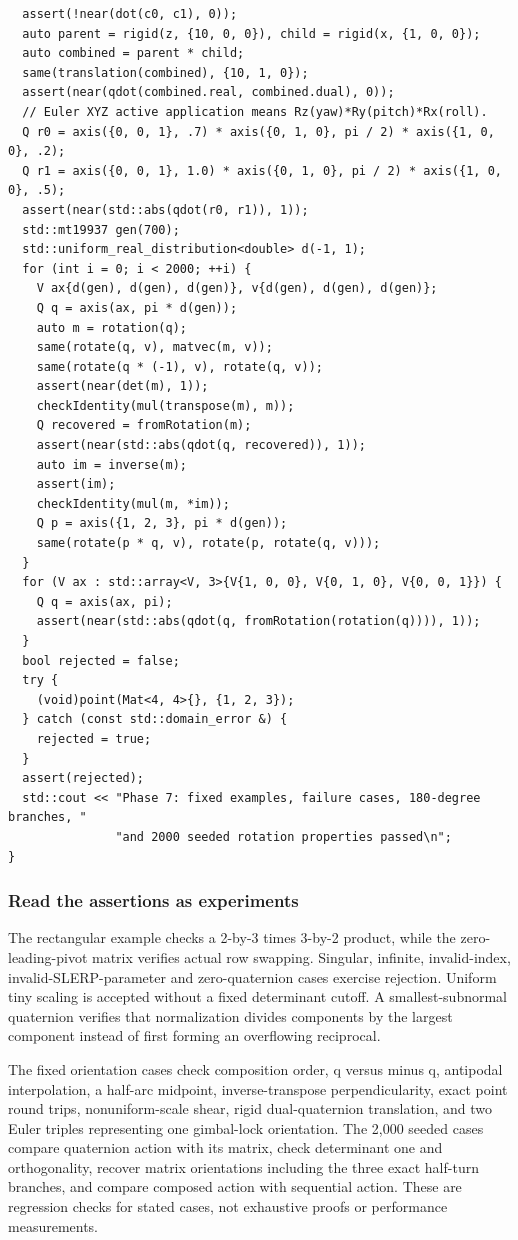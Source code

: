 \begin{verbatim}
  assert(!near(dot(c0, c1), 0));
  auto parent = rigid(z, {10, 0, 0}), child = rigid(x, {1, 0, 0});
  auto combined = parent * child;
  same(translation(combined), {10, 1, 0});
  assert(near(qdot(combined.real, combined.dual), 0));
  // Euler XYZ active application means Rz(yaw)*Ry(pitch)*Rx(roll).
  Q r0 = axis({0, 0, 1}, .7) * axis({0, 1, 0}, pi / 2) * axis({1, 0, 0}, .2);
  Q r1 = axis({0, 0, 1}, 1.0) * axis({0, 1, 0}, pi / 2) * axis({1, 0, 0}, .5);
  assert(near(std::abs(qdot(r0, r1)), 1));
  std::mt19937 gen(700);
  std::uniform_real_distribution<double> d(-1, 1);
  for (int i = 0; i < 2000; ++i) {
    V ax{d(gen), d(gen), d(gen)}, v{d(gen), d(gen), d(gen)};
    Q q = axis(ax, pi * d(gen));
    auto m = rotation(q);
    same(rotate(q, v), matvec(m, v));
    same(rotate(q * (-1), v), rotate(q, v));
    assert(near(det(m), 1));
    checkIdentity(mul(transpose(m), m));
    Q recovered = fromRotation(m);
    assert(near(std::abs(qdot(q, recovered)), 1));
    auto im = inverse(m);
    assert(im);
    checkIdentity(mul(m, *im));
    Q p = axis({1, 2, 3}, pi * d(gen));
    same(rotate(p * q, v), rotate(p, rotate(q, v)));
  }
  for (V ax : std::array<V, 3>{V{1, 0, 0}, V{0, 1, 0}, V{0, 0, 1}}) {
    Q q = axis(ax, pi);
    assert(near(std::abs(qdot(q, fromRotation(rotation(q)))), 1));
  }
  bool rejected = false;
  try {
    (void)point(Mat<4, 4>{}, {1, 2, 3});
  } catch (const std::domain_error &) {
    rejected = true;
  }
  assert(rejected);
  std::cout << "Phase 7: fixed examples, failure cases, 180-degree branches, "
               "and 2000 seeded rotation properties passed\n";
}
\end{verbatim}

\subsubsection{Read the assertions as experiments}\label{read-the-assertions-as-experiments}

The rectangular example checks a 2-by-3 times 3-by-2 product, while the zero-leading-pivot matrix verifies actual row swapping. Singular, infinite, invalid-index, invalid-SLERP-parameter and zero-quaternion cases exercise rejection. Uniform tiny scaling is accepted without a fixed determinant cutoff. A smallest-subnormal quaternion verifies that normalization divides components by the largest component instead of first forming an overflowing reciprocal.

The fixed orientation cases check composition order, q versus minus q, antipodal interpolation, a half-arc midpoint, inverse-transpose perpendicularity, exact point round trips, nonuniform-scale shear, rigid dual-quaternion translation, and two Euler triples representing one gimbal-lock orientation. The 2,000 seeded cases compare quaternion action with its matrix, check determinant one and orthogonality, recover matrix orientations including the three exact half-turn branches, and compare composed action with sequential action. These are regression checks for stated cases, not exhaustive proofs or performance measurements.

